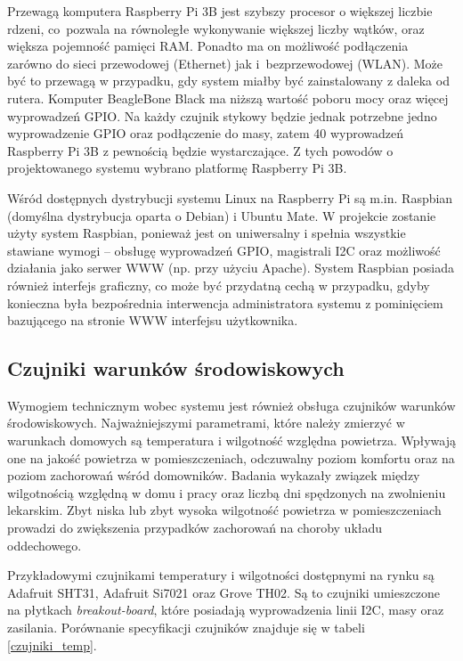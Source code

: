 \documentclass[a4paper,11pt,twoside]{article}
\begin{document}
Przewagą komputera Raspberry Pi 3B jest szybszy procesor o większej liczbie rdzeni, co~pozwala na równoległe wykonywanie większej liczby wątków, oraz większa pojemność pamięci RAM. Ponadto ma on możliwość podłączenia zarówno do sieci przewodowej (Ethernet) jak i~bezprzewodowej (WLAN). Może być to przewagą w przypadku, gdy system miałby być zainstalowany z daleka od rutera. Komputer BeagleBone Black ma niższą wartość poboru mocy oraz więcej wyprowadzeń GPIO. Na każdy czujnik stykowy będzie jednak potrzebne jedno wyprowadzenie GPIO oraz podłączenie do masy, zatem 40 wyprowadzeń Raspberry Pi 3B z pewnością będzie wystarczające. Z tych powodów o projektowanego systemu wybrano platformę Raspberry Pi 3B.

Wśród dostępnych dystrybucji systemu Linux na Raspberry Pi są m.in. Raspbian (domyślna dystrybucja oparta o Debian) i Ubuntu Mate. W projekcie zostanie użyty system Raspbian, ponieważ jest on uniwersalny i spełnia wszystkie stawiane wymogi -- obsługę wyprowadzeń GPIO, magistrali I2C oraz możliwość działania jako serwer WWW (np. przy użyciu Apache). System Raspbian posiada również interfejs graficzny, co może być przydatną cechą w przypadku, gdyby konieczna była bezpośrednia interwencja administratora systemu z pominięciem bazującego na stronie WWW interfejsu użytkownika.

\subsection{Czujniki warunków środowiskowych}
Wymogiem technicznym wobec systemu jest również obsługa czujników warunków środowiskowych. Najważniejszymi parametrami, które należy zmierzyć w warunkach domowych są temperatura i wilgotność względna powietrza. Wpływają one na jakość powietrza w pomieszczeniach, odczuwalny poziom komfortu oraz na poziom zachorowań wśród domowników. Badania wykazały związek między wilgotnością względną w domu i pracy oraz liczbą dni spędzonych na zwolnieniu lekarskim. Zbyt niska lub zbyt wysoka wilgotność powietrza w pomieszczeniach prowadzi do zwiększenia przypadków zachorowań na choroby układu oddechowego\cite{zachorowania}\cite{klimat}. 

Przykładowymi czujnikami temperatury i wilgotności dostępnymi na rynku są Adafruit SHT31, Adafruit Si7021 oraz Grove TH02. Są to czujniki umieszczone na płytkach \textit{breakout-board}, które posiadają wyprowadzenia linii I2C, masy oraz zasilania. Porównanie specyfikacji czujników znajduje się w tabeli \ref{czujniki_temp}.
\end{document}

